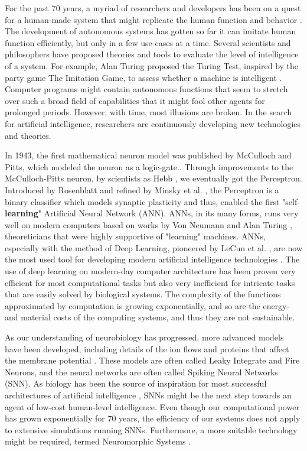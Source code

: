 For the past 70 years, a myriad of researchers and developers has been on a quest for a human-made system that might replicate the human function and behavior \cite{haenlein_brief_2019}.
The development of autonomous systems has gotten so far it can imitate human function efficiently, but only in a few use-cases at a time.
Several scientists and philosophers have proposed theories and tools to evaluate the level of intelligence of a system.
For example, Alan Turing proposed the Turing Test, inspired by the party game The Imitation Game, to assess whether a machine is intelligent \cite{turing_computing_2009}.
Computer programs might contain autonomous functions that seem to stretch over such a broad field of capabilities
that it might fool other agents for prolonged periods. However, with time, most illusions are broken.
In the search for artificial intelligence, researchers are continuously developing new technologies and theories.

In 1943, the first mathematical neuron model was published by McCulloch and Pitts, which modeled the neuron as a logic-gate.\cite{cowan_discussion_1990}.
Through improvements to the McCulloch-Pitts neuron, by scientists as Hebb \cite{brown_legacy_2003}, we eventually got the Perceptron.
Introduced by Rosenblatt \cite{rosenblatt_perceptron_1958} and refined by Minsky et al. \cite{minsky_perceptrons_2017}, the Perceptron is a binary classifier which models synaptic plasticity and thus, enabled the first "self-\textbf{learning}" Artificial Neural Network (ANN).
ANNs, in its many forms, runs very well on modern computers based on works by Von Neumann and Alan Turing \cite{von_neumann_first_1993}, theoreticians that were highly supportive of "learning" machines. ANNs, especially with the method of Deep Learning, pioneered by LeCun et al. \cite{lecun_gradient-based_1998}, are now the most used tool for developing modern artificial intelligence technologies \cite{haenlein_brief_2019}. The use of deep learning on modern-day computer architecture has been proven very efficient for most computational tasks but also very inefficient for intricate tasks that are easily solved by biological systems.
The complexity of the functions approximated by computation is growing exponentially, and so are the energy- and material costs of the computing systems, and thus they are not sustainable.

As our understanding of neurobiology has progressed, more advanced models have been developed, including details of the ion flows and proteins that affect the membrane potential \cite{burkitt_review_2006}.
These models are often called Leaky Integrate and Fire Neurons, and the neural networks are often called Spiking Neural Networks (SNN). As biology has been the source of inspiration for most successful architectures of artificial intelligence \cite{minsky_perceptrons_2017}, SNNs might be the next step towards an agent of low-cost human-level intelligence.
Even though our computational power has grown exponentially for 70 years, the efficiency of our systems does not apply to extensive simulations running SNNs.
Furthermore, a more suitable technology might be required, termed Neuromorphic Systems \cite{furber_large-scale_2016}\cite{schuman_survey_2017}.

